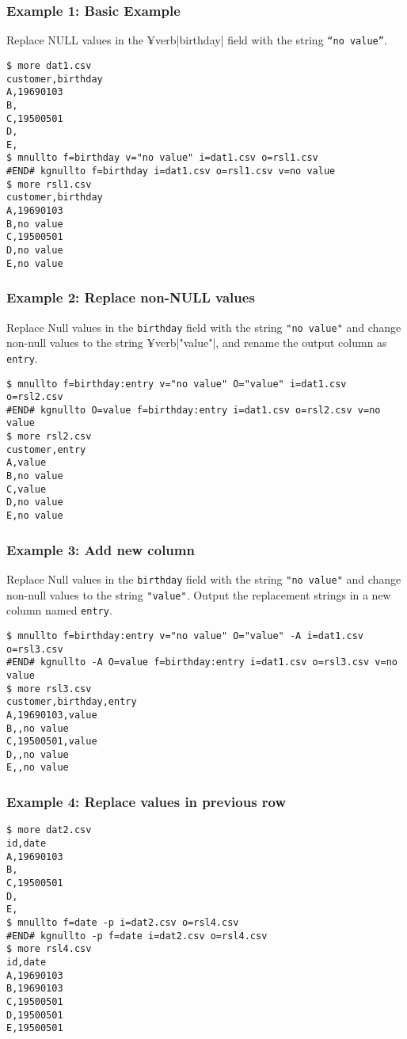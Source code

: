 \subsubsection*{Example 1: Basic Example}

Replace NULL values in the ¥verb|birthday| field with the string \verb|“no value”|.


\begin{Verbatim}[baselinestretch=0.7,frame=single]
$ more dat1.csv
customer,birthday
A,19690103
B,
C,19500501
D,
E,
$ mnullto f=birthday v="no value" i=dat1.csv o=rsl1.csv
#END# kgnullto f=birthday i=dat1.csv o=rsl1.csv v=no value
$ more rsl1.csv
customer,birthday
A,19690103
B,no value
C,19500501
D,no value
E,no value
\end{Verbatim}
\subsubsection*{Example 2: Replace non-NULL values}

Replace Null values in the \verb|birthday| field with the string \verb|"no value"| and change non-null values to the string ¥verb|"value"|, and rename the output column as \verb|entry|.


\begin{Verbatim}[baselinestretch=0.7,frame=single]
$ mnullto f=birthday:entry v="no value" O="value" i=dat1.csv o=rsl2.csv
#END# kgnullto O=value f=birthday:entry i=dat1.csv o=rsl2.csv v=no value
$ more rsl2.csv
customer,entry
A,value
B,no value
C,value
D,no value
E,no value
\end{Verbatim}
\subsubsection*{Example 3: Add new column}

Replace Null values in the \verb|birthday| field with the string \verb|"no value"| and change non-null values to the string \verb|"value"|. Output the replacement strings in a new column named \verb|entry|.


\begin{Verbatim}[baselinestretch=0.7,frame=single]
$ mnullto f=birthday:entry v="no value" O="value" -A i=dat1.csv o=rsl3.csv
#END# kgnullto -A O=value f=birthday:entry i=dat1.csv o=rsl3.csv v=no value
$ more rsl3.csv
customer,birthday,entry
A,19690103,value
B,,no value
C,19500501,value
D,,no value
E,,no value
\end{Verbatim}
\subsubsection*{Example 4: Replace values in previous row}



\begin{Verbatim}[baselinestretch=0.7,frame=single]
$ more dat2.csv
id,date
A,19690103
B,
C,19500501
D,
E,
$ mnullto f=date -p i=dat2.csv o=rsl4.csv
#END# kgnullto -p f=date i=dat2.csv o=rsl4.csv
$ more rsl4.csv
id,date
A,19690103
B,19690103
C,19500501
D,19500501
E,19500501
\end{Verbatim}
